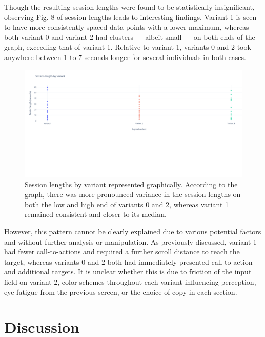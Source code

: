 \documentclass[conference]{IEEEtran}
\begin{document}
Though the resulting session lengths were found to be statistically insignificant, observing Fig. 8 of session lengths leads to interesting findings. Variant 1 is seen to have more consistently spaced data points with a lower maximum, whereas both variant 0 and variant 2 had clusters — albeit small — on both ends of the graph, exceeding that of variant 1. Relative to variant 1, variants 0 and 2 took anywhere between 1 to 7 seconds longer for several individuals in both cases.

\begin{figure}[h]
\centering
\label{fig:variant2}
\includegraphics[width=\textwidth]{media/Session length by variant (1).png}
\caption{Session lengths by variant represented graphically. According to the graph, there was more pronounced variance in the session lengths on both the low and high end of variants 0 and 2, whereas variant 1 remained consistent and closer to its median.}
\end{figure}

However, this pattern cannot be clearly explained due to various potential factors and without further analysis or manipulation. As previously discussed, variant 1 had fewer call-to-actions and required a further scroll distance to reach the target, whereas variants 0 and 2 both had immediately presented call-to-action and additional targets. It is unclear whether this is due to friction of the input field on variant 2, color schemes throughout each variant influencing perception, eye fatigue from the previous screen, or the choice of copy in each section.
 
\section{Discussion}
\end{document}
